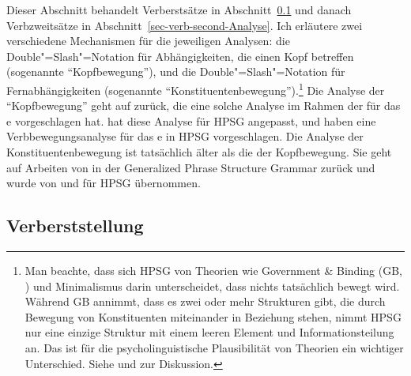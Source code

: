 Dieser Abschnitt behandelt Verberstsätze in Abschnitt~\ref{sec-verb-first-Analyse} und danach
Verbzweitsätze in Abschnitt~\ref{sec-verb-second-Analyse}. Ich erläutere zwei verschiedene Mechanismen für die
jeweiligen Analysen: die Double"=Slash"=Notation für Abhängigkeiten, die einen Kopf betreffen (sogenannte "`Kopfbewegung"'), und die Double"=Slash"=Notation
für Fernabhängigkeiten (sogenannte "`Konstituentenbewegung"').\footnote{
  Man beachte, dass sich HPSG von Theorien wie Government \& Binding (GB, \citealt{Chomsky81a}) und
  Minimalismus \citep{Chomsky95a-u} darin unterscheidet, dass nichts
  tatsächlich bewegt wird. Während GB annimmt, dass es zwei oder mehr Strukturen gibt, die durch
  Bewegung von Konstituenten miteinander in Beziehung stehen, nimmt HPSG nur eine einzige Struktur mit einem leeren Element und Informationsteilung
  an. Das ist für die psycholinguistische Plausibilität von
  Theorien ein wichtiger Unterschied. Siehe  und  zur
  Diskussion. 
}
Die Analyse der "`Kopfbewegung"' geht auf \citet{Jacobson87} zurück, die eine solche Analyse
im Rahmen der  für das e vorgeschlagen hat. \citet{Borsley89} hat diese Analyse für HPSG angepasst,
und \citet{KW91a,Kiss95a,Kiss95b} haben eine Verbbewegungsanalyse für das e in HPSG vorgeschlagen. Die Analyse der
Konstituentenbewegung ist tatsächlich älter als die der Kopfbewegung. Sie geht auf Arbeiten von \citet{Gazdar81a} in der
Generalized Phrase Structure Grammar zurück und wurde von \citet[Abschnitt~3.4]{ps} und \citet[Kapitel~4]{ps2} für HPSG übernommen.

\subsection{Verberststellung}
\label{sec-verb-first-Analyse}

